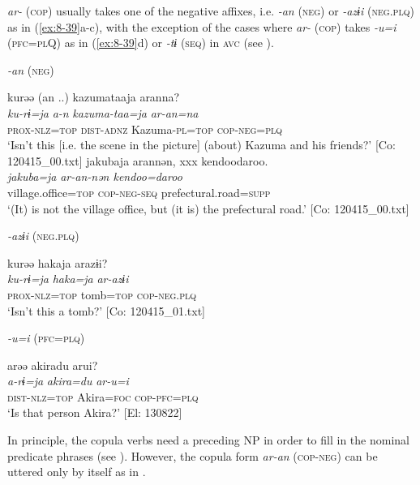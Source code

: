 \textit{ar-} (\textsc{cop}) usually takes one of the negative affixes, i.e. \textit{-an} (\textsc{neg}) or \textit{-azɨi} (\textsc{neg}.\textsc{plq}) as in (\ref{ex:8-39}a-c), with the exception of the cases where \textit{ar-} (\textsc{cop}) takes \textit{-u=i} (\textsc{pfc}=\textsc{pl}Q) as in (\ref{ex:8-39}d) or \textit{-tɨ} (\textsc{seq}) in \textsc{avc} (see ).

\ea\label{ex:8-39}
  \textit{-an} (\textsc{neg})

\ea
{\TM}
\glll  kurəə  (an ..)  kazumataaja  aranna?\\
\textit{ku-rɨ=ja}  \textit{a-n}  \textit{kazuma-taa=ja}  \textit{ar-an=na}\\
\textsc{prox}-\textsc{nlz}=\textsc{top}  \textsc{dist}-\textsc{adnz}  Kazuma-\textsc{pl}=\textsc{top}  \textsc{cop}-\textsc{neg}=\textsc{plq}\\
\glt ‘Isn’t this [i.e. the scene in the picture] (about) Kazuma and his friends?’ [Co: 120415\_00.txt]
\ex
{\TM}
\glll  jakubaja  arannən,  xxx  {\textbar}kendoo{\textbar}daroo.\\
\textit{jakuba=ja}  \textit{ar-an-nən    kendoo=daroo}\\
village.office=\textsc{top}  \textsc{cop}-\textsc{neg}-\textsc{seq}    prefectural.road=\textsc{supp}\\
\glt ‘(It) is not the village office, but (it is) the prefectural road.’ [Co: 120415\_00.txt]

  \textit{-azɨi} (\textsc{neg}.\textsc{plq})

\ex
{\TM}
\glll  kurəə  hakaja  arazɨi?\\
\textit{ku-rɨ=ja}  \textit{haka=ja}  \textit{ar-azɨi}\\
\textsc{prox}-\textsc{nlz}=\textsc{top}  tomb=\textsc{top}  \textsc{cop}-\textsc{neg}.\textsc{plq}\\
\glt ‘Isn’t this a tomb?’ [Co: 120415\_01.txt]

  \textit{-u=i} (\textsc{pfc}=\textsc{plq})

\ex
{\TM}
\glll  arəə  akiradu  arui?\\
\textit{a-rɨ=ja}  \textit{akira=du}  \textit{ar-u=i}\\
\textsc{dist}-\textsc{nlz}=\textsc{top}  Akira=\textsc{foc}  \textsc{cop}-\textsc{pfc}=\textsc{plq}\\
\glt ‘Is that person Akira?’ [El: 130822]
\z
\z

  In principle, the copula verbs need a preceding NP in order to fill in the nominal predicate phrases (see ). However, the copula form \textit{ar-an} (\textsc{cop}-\textsc{neg}) can be uttered only by itself as in .

